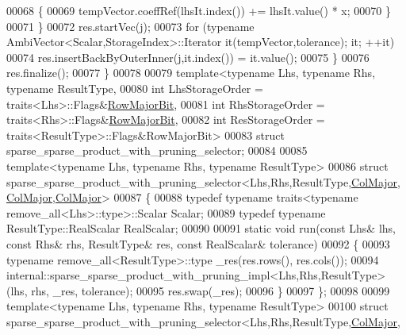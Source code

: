 \begin{DoxyCode}
00068       \{
00069         tempVector.coeffRef(lhsIt.index()) += lhsIt.value() * x;
00070       \}
00071     \}
00072     res.startVec(j);
00073     \textcolor{keywordflow}{for} (\textcolor{keyword}{typename} AmbiVector<Scalar,StorageIndex>::Iterator it(tempVector,tolerance); it; ++it)
00074       res.insertBackByOuterInner(j,it.index()) = it.value();
00075   \}
00076   res.finalize();
00077 \}
00078 
00079 \textcolor{keyword}{template}<\textcolor{keyword}{typename} Lhs, \textcolor{keyword}{typename} Rhs, \textcolor{keyword}{typename} ResultType,
00080   \textcolor{keywordtype}{int} LhsStorageOrder = traits<Lhs>::Flags&\hyperlink{group__flags_gae4f56c2a60bbe4bd2e44c5b19cbe8762}{RowMajorBit},
00081   \textcolor{keywordtype}{int} RhsStorageOrder = traits<Rhs>::Flags&\hyperlink{group__flags_gae4f56c2a60bbe4bd2e44c5b19cbe8762}{RowMajorBit},
00082   \textcolor{keywordtype}{int} ResStorageOrder = traits<ResultType>::Flags&RowMajorBit>
00083 \textcolor{keyword}{struct }sparse\_sparse\_product\_with\_pruning\_selector;
00084 
00085 \textcolor{keyword}{template}<\textcolor{keyword}{typename} Lhs, \textcolor{keyword}{typename} Rhs, \textcolor{keyword}{typename} ResultType>
00086 \textcolor{keyword}{struct }sparse\_sparse\_product\_with\_pruning\_selector<Lhs,Rhs,ResultType,\hyperlink{group__enums_ggaacded1a18ae58b0f554751f6cdf9eb13a0cbd4bdd0abcfc0224c5fcb5e4f6669a}{ColMajor},
      \hyperlink{group__enums_ggaacded1a18ae58b0f554751f6cdf9eb13a0cbd4bdd0abcfc0224c5fcb5e4f6669a}{ColMajor},\hyperlink{group__enums_ggaacded1a18ae58b0f554751f6cdf9eb13a0cbd4bdd0abcfc0224c5fcb5e4f6669a}{ColMajor}>
00087 \{
00088   \textcolor{keyword}{typedef} \textcolor{keyword}{typename} traits<typename remove\_all<Lhs>::type>::Scalar Scalar;
00089   \textcolor{keyword}{typedef} \textcolor{keyword}{typename} ResultType::RealScalar RealScalar;
00090 
00091   \textcolor{keyword}{static} \textcolor{keywordtype}{void} run(\textcolor{keyword}{const} Lhs& lhs, \textcolor{keyword}{const} Rhs& rhs, ResultType& res, \textcolor{keyword}{const} RealScalar& tolerance)
00092   \{
00093     \textcolor{keyword}{typename} remove\_all<ResultType>::type \_res(res.rows(), res.cols());
00094     internal::sparse\_sparse\_product\_with\_pruning\_impl<Lhs,Rhs,ResultType>(lhs, rhs, \_res, tolerance);
00095     res.swap(\_res);
00096   \}
00097 \};
00098 
00099 \textcolor{keyword}{template}<\textcolor{keyword}{typename} Lhs, \textcolor{keyword}{typename} Rhs, \textcolor{keyword}{typename} ResultType>
00100 \textcolor{keyword}{struct }sparse\_sparse\_product\_with\_pruning\_selector<Lhs,Rhs,ResultType,\hyperlink{group__enums_ggaacded1a18ae58b0f554751f6cdf9eb13a0cbd4bdd0abcfc0224c5fcb5e4f6669a}{ColMajor},

\end{DoxyCode}
